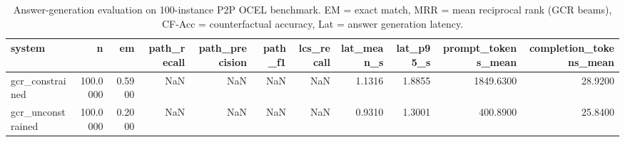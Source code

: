 \begin{table}
\caption{Answer-generation evaluation on 100-instance P2P OCEL benchmark. EM = exact match, MRR = mean reciprocal rank (GCR beams), CF-Acc = counterfactual accuracy, Lat = answer generation latency.}
\label{tab:answer_results}
\begin{tabular}{lrrrrrrrrrr}
\toprule
system & n & em & path_recall & path_precision & path_f1 & lcs_recall & lat_mean_s & lat_p95_s & prompt_tokens_mean & completion_tokens_mean \\
\midrule
gcr_constrained & 100.0000 & 0.5900 & NaN & NaN & NaN & NaN & 1.1316 & 1.8855 & 1849.6300 & 28.9200 \\
gcr_unconstrained & 100.0000 & 0.2000 & NaN & NaN & NaN & NaN & 0.9310 & 1.3001 & 400.8900 & 25.8400 \\
\bottomrule
\end{tabular}
\end{table}

